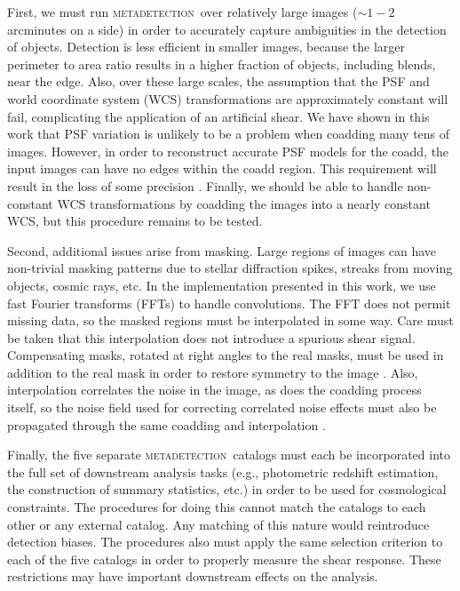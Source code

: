 \documentclass[iop, appendixfloats, numberedappendix, apj]{emulateapj}
\newcommand{\mdet}{\textsc{metadetection}}
\begin{document}
First, we must run \mdet\ over relatively large images ($\sim1-2$ arcminutes on
a side) in order to accurately capture ambiguities in the detection of objects.
Detection is less efficient in smaller images, because the larger perimeter to
area ratio results in a higher fraction of objects, including blends, near the
edge.  Also, over these large scales, the assumption that the PSF and world
coordinate system (WCS) transformations are approximately constant will fail,
complicating the application of an artificial shear. We have shown in this work
that PSF variation is unlikely to be a problem when coadding many tens of
images. However, in order to reconstruct accurate PSF models for the coadd, the
input images can have no edges within the coadd region. This requirement will
result in the loss of some precision \citep{ArmstrongCoadd}. Finally, we should
be able to handle non-constant WCS transformations by coadding the images into
a nearly constant WCS, but this procedure remains to be tested.

Second, additional issues arise from masking. Large regions of images can have
non-trivial masking patterns due to stellar diffraction spikes, streaks from
moving objects, cosmic rays, etc. In the implementation presented in this work,
we use fast Fourier transforms (FFTs) to handle convolutions. The FFT does not
permit missing data, so the masked regions must be interpolated in some way.
Care must be taken that this interpolation does not introduce a spurious shear
signal.  Compensating masks, rotated at right angles to the real masks, must be
used in addition to the real mask in order to restore symmetry to the image
\citep{SheldonMcal2017}.  Also, interpolation correlates the noise in the
image, as does the coadding process itself, so the noise field used for
correcting correlated noise effects must also be propagated through the same
coadding and interpolation \citep{SheldonMcal2017,ArmstrongCoadd}.

Finally, the five separate \mdet\ catalogs must each be incorporated into the
full set of downstream analysis tasks (e.g., photometric redshift estimation,
the construction of summary statistics, etc.) in order to be used for
cosmological constraints. The procedures for doing this cannot match the
catalogs to each other or any external catalog. Any matching of this nature would
reintroduce detection biases. The procedures also must apply the same
selection criterion to each of the five catalogs in order to properly measure
the shear response. These restrictions may have important downstream effects on
the analysis.
\end{document}

